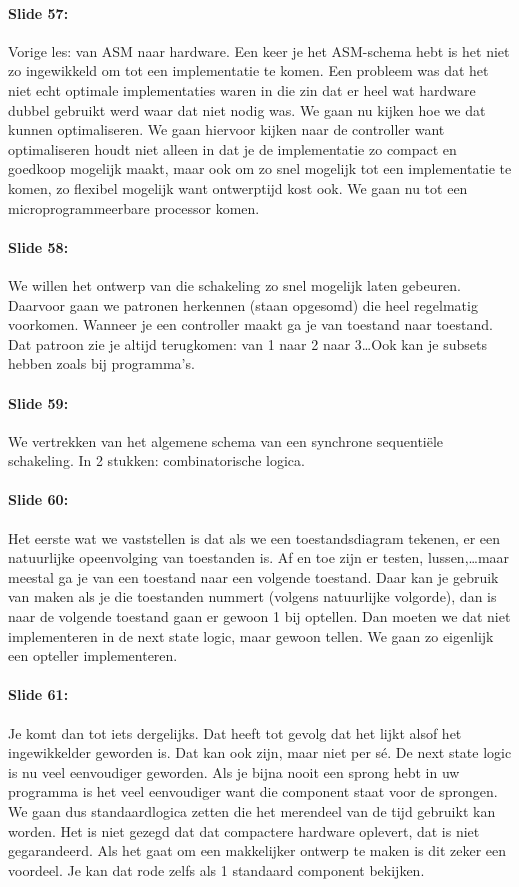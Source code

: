 \documentclass[10pt,a4paper]{book}
\begin{document}
\paragraph{Slide 57:} Vorige les: van ASM naar hardware. Een keer je het ASM-schema hebt is het niet zo ingewikkeld om tot een implementatie te komen. Een probleem was dat het niet echt optimale implementaties waren in die zin dat er heel wat hardware dubbel gebruikt werd waar dat niet nodig was. We gaan nu kijken hoe we dat kunnen optimaliseren. We gaan hiervoor kijken naar de controller want optimaliseren houdt niet alleen in dat je de implementatie zo compact en goedkoop mogelijk maakt, maar ook om zo snel mogelijk tot een implementatie te komen, zo flexibel mogelijk want ontwerptijd kost ook. We gaan nu tot een microprogrammeerbare processor komen.

\paragraph{Slide 58:} We willen het ontwerp van die schakeling zo snel mogelijk laten gebeuren. Daarvoor gaan we patronen herkennen (staan opgesomd) die heel regelmatig voorkomen. Wanneer je een controller maakt ga je van toestand naar toestand. Dat patroon zie je altijd terugkomen: van 1 naar 2 naar 3\ldots Ook kan je subsets hebben zoals bij programma's.

\paragraph{Slide 59:} We vertrekken van het algemene schema van een synchrone sequenti\"ele schakeling. In 2 stukken: combinatorische logica.

\paragraph{Slide 60:} Het eerste wat we vaststellen is dat als we een toestandsdiagram tekenen, er een natuurlijke opeenvolging van toestanden is. Af en toe zijn er testen, lussen,\ldots maar meestal ga je van een toestand naar een volgende toestand. Daar kan je gebruik van maken als je die toestanden nummert (volgens natuurlijke volgorde), dan is naar de volgende toestand gaan er gewoon 1 bij optellen. Dan moeten we dat niet implementeren in de next state logic, maar gewoon tellen. We gaan zo eigenlijk een opteller implementeren.

\paragraph{Slide 61:} Je komt dan tot iets dergelijks. Dat heeft tot gevolg dat het lijkt alsof het ingewikkelder geworden is. Dat kan ook zijn, maar niet per s\'e. De next state logic is nu veel eenvoudiger geworden. Als je bijna nooit een sprong hebt in uw programma is het veel eenvoudiger want die component staat voor de sprongen. We gaan dus standaardlogica zetten die het merendeel van de tijd gebruikt kan worden. Het is niet gezegd dat dat compactere hardware oplevert, dat is niet gegarandeerd. Als het gaat om een makkelijker ontwerp te maken is dit zeker een voordeel. Je kan dat rode zelfs als 1 standaard component bekijken.
\end{document}
